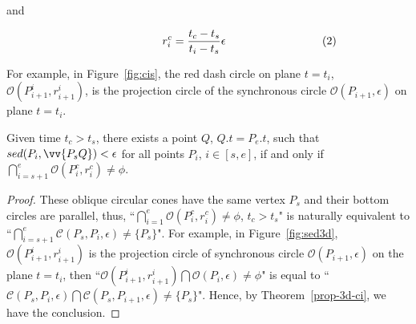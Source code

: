 and

\vspace{-2ex}
\begin{equation*}
\label{equ-proj-circle-r}
    \begin{aligned}
        \hspace{17ex}  r^c_i =\frac{t_c-t_s}{t_i-t_s}{\epsilon}   \hspace{20ex}(2) \\
    \end{aligned}
\end{equation*}
\vspace{-1ex}



For example, in Figure~\ref{fig:cis}, the red dash circle on plane $t=t_i$, \ie $\mathcal{O}(P^i_{i+1}, r^i_{i+1})$, is the projection circle of the synchronous circle $\mathcal{O}(P_{i+1}, \epsilon)$ on plane $t=t_i$.


\begin{cor}
\label{prop-circle-intersection}
Given time $t_c > t_s$, there exists a point $Q$, $Q.t = P_e.t$, such that $sed(P_i, \vv{P_sQ})<\epsilon$ for all points $P_i$, $i \in [s,e]$, if and only if $\bigcap_{i=s+1}^{e}{\mathcal{O}(P^c_i, r^c_i)} \ne \phi$.
\end{cor}


\begin{proof}
These oblique circular cones have the same vertex $P_s$ and their bottom circles are parallel, thus,
 ``$\bigcap_{i=1}^{e}{\mathcal{O}(P^c_i, r^c_i)} \ne \phi$, $t_c > t_s$" is naturally equivalent to ``$\bigcap_{i=s+1}^{e}{\mathcal{C}(P_s, P_i, \epsilon)} \ne \{P_s\}$".
For example, in Figure~\ref{fig:sed3d}, $\mathcal{O}(P^i_{i+1}, r^i_{i+1})$ is the projection circle of synchronous circle $\mathcal{O}(P_{i+1}, \epsilon)$ on the plane $t=t_i$, then ``${\mathcal{O}(P^i_{i+1}, r^i_{i+1})} \bigcap{\mathcal{O}(P_i, \epsilon)} \ne \phi$" is equal to ``$\mathcal{C}(P_s, P_i, \epsilon) \bigcap {\mathcal{C}(P_s, P_{i+1}, \epsilon)} \ne \{P_s\}$".
Hence, by Theorem~\ref{prop-3d-ci}, we have the conclusion.
\end{proof}


